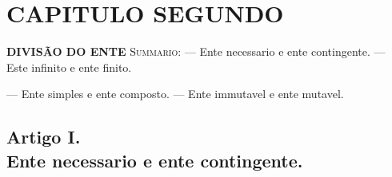 


\chapter*{CAPITULO SEGUNDO}

\textbf{DIVISÃO DO ENTE} \textsc{Summario}: --- Ente necessario e ente contingente. --- Este infinito e ente finito.

--- Ente simples e ente composto. --- Ente immutavel e ente mutavel.


\section*{Artigo I.\\ Ente necessario e ente contingente.}


